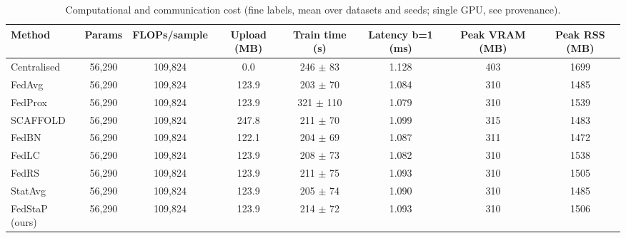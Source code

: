 \begin{table}[t]
\centering
\caption{Computational and communication cost (fine labels, mean over datasets and seeds; single GPU, see provenance).}
\label{tab:cost}
\small
\begin{tabular}{lccccccc}
\toprule
Method & Params & FLOPs/sample & Upload (MB) & Train time (s) & Latency b=1 (ms) & Peak VRAM (MB) & Peak RSS (MB) \\
\midrule
Centralised & 56,290 & 109,824 & 0.0 & 246 $\pm$ 83 & 1.128 & 403 & 1699 \\
FedAvg & 56,290 & 109,824 & 123.9 & 203 $\pm$ 70 & 1.084 & 310 & 1485 \\
FedProx & 56,290 & 109,824 & 123.9 & 321 $\pm$ 110 & 1.079 & 310 & 1539 \\
SCAFFOLD & 56,290 & 109,824 & 247.8 & 211 $\pm$ 70 & 1.099 & 315 & 1483 \\
FedBN & 56,290 & 109,824 & 122.1 & 204 $\pm$ 69 & 1.087 & 311 & 1472 \\
FedLC & 56,290 & 109,824 & 123.9 & 208 $\pm$ 73 & 1.082 & 310 & 1538 \\
FedRS & 56,290 & 109,824 & 123.9 & 211 $\pm$ 75 & 1.093 & 310 & 1505 \\
StatAvg & 56,290 & 109,824 & 123.9 & 205 $\pm$ 74 & 1.090 & 310 & 1485 \\
FedStaP (ours) & 56,290 & 109,824 & 123.9 & 214 $\pm$ 72 & 1.093 & 310 & 1506 \\
\bottomrule
\end{tabular}
\end{table}
